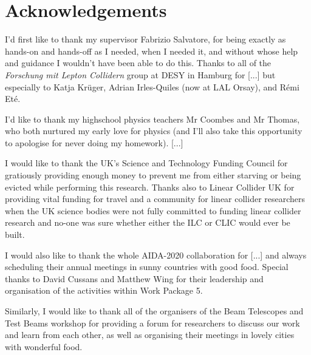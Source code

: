 \chapter*{Acknowledgements}


I'd first like to thank my supervisor Fabrizio Salvatore, for being exactly as hands-on and hands-off as I needed, when I needed it, and without whose help and guidance I wouldn't have been able to do this. Thanks to all of the \emph{Forschung mit Lepton Collidern} group at DESY in Hamburg for [...] but especially to Katja Kr\"{u}ger, Adrian Irles-Quiles (now at LAL Orsay), and R\'{e}mi Et\'{e}.

\newline

I'd like to thank my highschool physics teachers Mr Coombes and Mr Thomas, who both nurtured my early love for physics (and I'll also take this opportunity to apologise for never doing my homework). [...] 

I would like to thank the UK's Science and Technology Funding Council for gratiously providing enough money to prevent me from either starving or being evicted while performing this research. Thanks also to Linear Collider UK for providing vital funding for travel and a community for linear collider researchers when the UK science bodies were not fully committed to funding linear collider research and no-one was sure whether either the ILC or CLIC would ever be built.

I would also like to thank the whole AIDA-2020 collaboration for [...] and always scheduling their annual meetings in sunny countries with good food. Special thanks to David Cussans and Matthew Wing for their leadership and organisation of the activities within Work Package 5.


Similarly, I would like to thank all of the organisers of the Beam Telescopes and Test Beams workshop for providing a forum for researchers to discuss our work and learn from each other, as well as organising their meetings in lovely cities with wonderful food. 